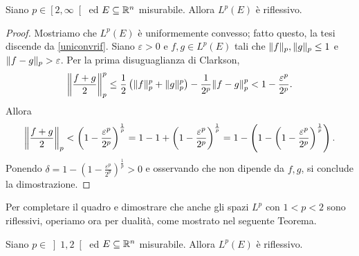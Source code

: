 \begin{teorema}
	Siano $p \in \left[ 2, \infty \right[ $ ed $E \subseteq \R^{n} $ misurabile. Allora $L^{p}(E)$ è riflessivo.
\end{teorema}
\begin{proof}
	Mostriamo che $L^{p}(E)$ è uniformemente convesso; fatto questo, la tesi discende da \eqref{uniconvrif}. Siano $\varepsilon > 0$ e $f,g \in L^{p}(E)$ tali che $\norm{f}_p,\norm{g}_p \leq 1$ e $\norm{f-g}_{p} > \varepsilon$. Per la prima disuguaglianza di Clarkson,
\[ \norm*{\frac{f+g}{2}}^{p}_{p} \le \frac{1}{2}\left( \norm{f}^{p}_{p} +  \norm{g}^{p}_{p}\right) -  \frac{1}{2^{p}}\norm*{f-g}^{p}_{p} < 1 - \frac{\varepsilon^{p}}{2^{p}}. \]
Allora
\[ \norm*{\frac{f+g}{2}}_{p} < \left(1 - \frac{\varepsilon^{p}}{2^{p}}\right) ^{\frac{1}{p}} = 1 - 1 + \left(1 - \frac{\varepsilon^{p}}{2^{p}}\right) ^{\frac{1}{p}} = 1 - \left( 1 - \left(1 - \frac{\varepsilon^{p}}{2^{p}}\right) ^{\frac{1}{p}}\right).\] 
Ponendo $\delta = 1 - \left(1 - \frac{\varepsilon^{p}}{2^{p}}\right) ^{\frac{1}{p}} > 0$ e osservando che non dipende da $f,g$, si conclude la dimostrazione.
\end{proof}

	Per completare il quadro e dimostrare che anche gli spazi $L^p$ con $1 < p < 2$ sono riflessivi, operiamo ora per dualità, come mostrato nel seguente Teorema.

\begin{teorema}\label{1,2rif}
	Siano $p \in \left]  1, 2 \right[ $ ed $E \subseteq \R^{n} $ misurabile. Allora $L^{p}(E)$ è riflessivo. 
\end{teorema}

